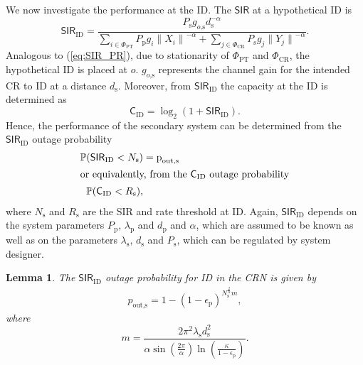\documentclass[conference, twocolumn]{IEEEtran}
\newcommand{\sub}[1]{_{\text{#1}}}
\newtheorem{lemma}{Lemma}
\begin{document}
We now investigate the performance at the ID. The $\textsf{SIR}$ at a hypothetical ID is 
\begin{equation}
\mathsf{SIR}\sub{ID} = \frac{P\sub{s} g\sub{$o$,s} d\sub{s}^{-\alpha}}{\sum\limits_{i \in \Phi_{\text{PT}}} P\sub{p} g_i {\|X_i\|}^{-\alpha} +  \sum\limits_{j \in \Phi_{\text{CR}}} P\sub{s} g_j {\|Y_j\|}^{-\alpha}}.
\label{eq:SIR_ID}  
\end{equation}
Analogous to (\ref{eq:SIR_PR}), due to stationarity of $\Phi\sub{PT}$ and $\Phi\sub{CR}$, the hypothetical ID is placed at $o$. $g\sub{$o$,s}$ represents the channel gain for the intended CR to ID at a distance $d\sub{s}$. Moreover, from $\textsf{SIR}\sub{ID}$ the capacity at the ID is determined as 
\begin{equation}
\textsf{C}\sub{ID} = \log_2 (1 + \textsf{SIR}\sub{ID}).
\label{eq:Cap}
\end{equation} 
Hence, the performance of the secondary system can be determined from the $\mathsf{SIR}\sub{ID}$ outage probability 
\begin{align}
\mathbb{P}(\textsf{SIR}\sub{ID} < N\sub{s}) &= \text{p}\sub{out,s} \label{eq:SIR_Out} \\
\intertext{or equivalently, from the $\textsf{C}\sub{ID}$ outage probability} 
\mathbb{P}(\textsf{C}\sub{ID} < R\sub{s}), \label{eq:Cap_Out}
\end{align} 
where $N\sub{s}$ and $R\sub{s}$ are the \textsf{SIR} and rate threshold at ID. 
Again, $\mathsf{SIR}\sub{ID}$ depends on the system parameters $P\sub{p}$, $\lambda\sub{p}$ and $d\sub{p}$ and $\alpha$, which are assumed to be known as well as on the parameters $\lambda\sub{s}$, $d\sub{s}$ and $P\sub{s}$, which can be regulated by system designer. %
\begin{lemma}\label{lem:lemm3}
\normalfont 
The $\mathsf{SIR}\sub{ID}$ outage probability for ID in the CRN is given by 
\begin{align}
p\sub{out,s} = 1 - \left(1 - \epsilon{\sub{p}}\right)^{N\sub{s}^{\frac{2}{\alpha}} m}, 
\label{eq:SIROutID}
\end{align}
where 
\begin{equation}
m = \frac{2 \pi^2 \lambda\sub{s}d\sub{s}^2}{ \alpha \sin\left( \frac{2\pi}{\alpha} \right) \ln \left( \frac{\kappa}{1 - \epsilon\sub{p}} \right) }.
\label{eq:m}
\end{equation}
\end{lemma}
\end{document}
